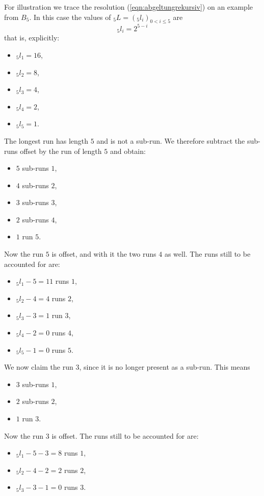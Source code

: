 \documentclass[11pt,a4paper]{scrartcl}
\theoremstyle{plain}
\theoremstyle{definition}
\theoremstyle{remark}
\begin{document}
For illustration we trace the resolution (\ref{eqn:abgeltungrekursiv})
on an example from $B_5$. In this case the values of
$_5L=(_5l_i)_{0<i\leq5}$ are
\begin{equation}
  _5l_i=2^{5-i}
\end{equation}
that is, explicitly:
\begin{itemize}
  \item $_5l_1=16$,
  \item $_5l_2=8$,
  \item $_5l_3=4$,
  \item $_5l_4=2$,
  \item $_5l_5=1$.
\end{itemize}
The longest run has length $5$ and is not a sub-run. We therefore
subtract the sub-runs offset by the run of length $5$ and obtain:
\begin{itemize}
  \item $5$ sub-runs $1$,
  \item $4$ sub-runs $2$,
  \item $3$ sub-runs $3$,
  \item $2$ sub-runs $4$,
  \item $1$ run $5$.
\end{itemize}
Now the run $5$ is offset, and with it the two runs $4$ as well. The
runs still to be accounted for are:
\begin{itemize}
  \item $_5l_1-5=11$ runs $1$,
  \item $_5l_2-4=4$ runs $2$,
  \item $_5l_3-3=1$ run $3$,
  \item $_5l_4-2=0$ runs $4$,
  \item $_5l_5-1=0$ runs $5$.
\end{itemize}
We now claim the run $3$, since it is no longer present as a
sub-run. This means
\begin{itemize}
  \item $3$ sub-runs $1$,
  \item $2$ sub-runs $2$,
  \item $1$ run $3$.
\end{itemize}
Now the run $3$ is offset. The runs still to be accounted for are:
\begin{itemize}
  \item $_5l_1-5-3=8$ runs $1$,
  \item $_5l_2-4-2=2$ runs $2$,
  \item $_5l_3-3-1=0$ runs $3$.
\end{itemize}
\end{document}
